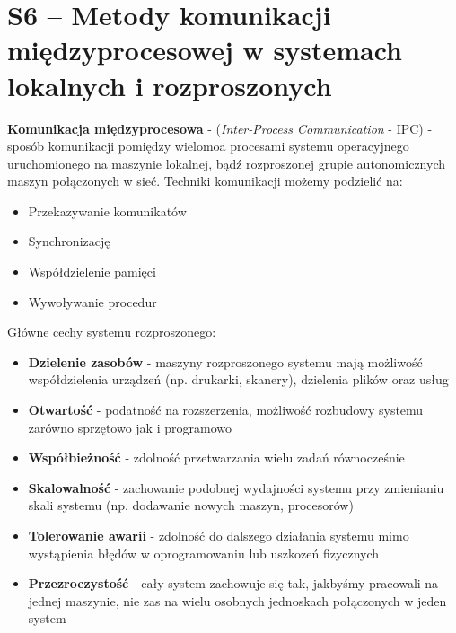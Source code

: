 \section{S6 -- Metody komunikacji międzyprocesowej w systemach lokalnych i rozproszonych}

\textbf{Komunikacja międzyprocesowa} - (\textit{Inter-Process Communication} - IPC) - sposób komunikacji pomiędzy wielomoa procesami systemu operacyjnego uruchomionego na maszynie lokalnej, bądź rozproszonej grupie autonomicznych maszyn połączonych w sieć. Techniki komunikacji możemy podzielić na:
\begin{itemize}
	\item Przekazywanie komunikatów
    \item Synchronizację
    \item Współdzielenie pamięci
    \item Wywoływanie procedur
\end{itemize}

Główne cechy systemu rozproszonego:
\begin{itemize}
	\item \textbf{Dzielenie zasobów} - maszyny rozproszonego systemu mają możliwość współdzielenia urządzeń (np. drukarki, skanery), dzielenia plików oraz usług
    \item \textbf{Otwartość} - podatność na rozszerzenia, możliwość rozbudowy systemu zarówno sprzętowo jak i programowo
    \item \textbf{Współbieżność} - zdolność przetwarzania wielu zadań równocześnie
    \item \textbf{Skalowalność} - zachowanie podobnej wydajności systemu przy zmienianiu skali systemu (np. dodawanie nowych maszyn, procesorów)
    \item \textbf{Tolerowanie awarii} - zdolność do dalszego działania systemu mimo wystąpienia błędów w oprogramowaniu lub uszkozeń fizycznych
    \item \textbf{Przezroczystość} - cały system zachowuje się tak, jakbyśmy pracowali na jednej maszynie, nie zas na wielu osobnych jednoskach połączonych w jeden system
\end{itemize}

